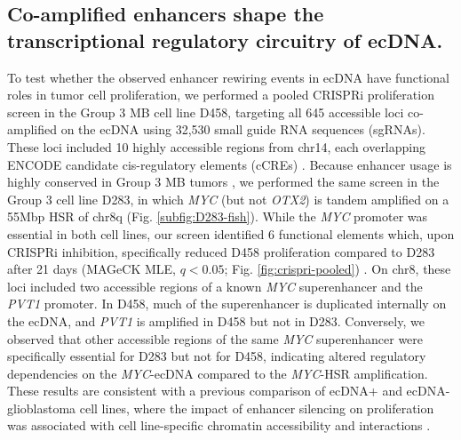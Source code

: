 \subsection{Co-amplified enhancers shape the transcriptional regulatory circuitry of ecDNA.}
To test whether the observed enhancer rewiring events in ecDNA have functional roles in tumor cell proliferation, we performed a pooled CRISPRi proliferation screen in the Group 3 MB cell line D458, targeting all 645 accessible loci co-amplified on the ecDNA using 32,530 small guide RNA sequences (sgRNAs). These loci included 10 highly accessible regions from chr14, each overlapping ENCODE candidate cis-regulatory elements (cCREs) \cite{encode}. Because enhancer usage is highly conserved in Group 3 MB tumors \cite{lin_2017}, we performed the same screen in the Group 3 cell line D283, in which \textit{MYC} (but not \textit{OTX2}) is tandem amplified on a 55Mbp \gls{HSR} of chr8q (Fig. \ref{subfig:D283-fish}). While the \textit{MYC} promoter was essential in both cell lines, our screen identified 6 functional elements which, upon CRISPRi inhibition, specifically reduced D458 proliferation compared to D283 after 21 days (MAGeCK MLE, $q < 0.05$; Fig. \ref{fig:crispri-pooled}) \cite{mageck}. On chr8, these loci included two accessible regions of a known \textit{MYC} superenhancer \cite{lin_2017} and the \textit{PVT1} promoter. In D458, much of the superenhancer is duplicated internally on the ecDNA, and \textit{PVT1} is amplified in D458 but not in D283.  Conversely, we observed that other accessible regions of the same \textit{MYC} superenhancer were specifically essential for D283 but not for D458, indicating altered regulatory dependencies on the \textit{MYC}-ecDNA compared to the \textit{MYC}-HSR amplification. These results are consistent with a previous comparison of ecDNA+ and ecDNA- glioblastoma cell lines, where the impact of enhancer silencing on proliferation was associated with cell line-specific chromatin accessibility and interactions \cite{Morton_2019}.

